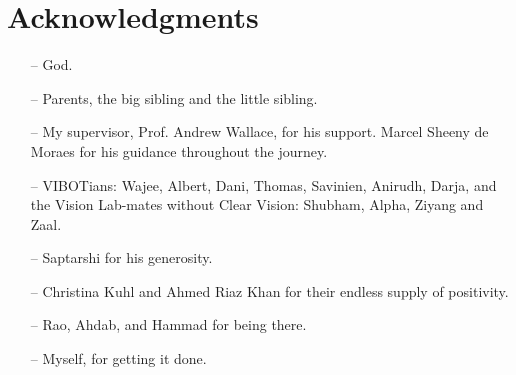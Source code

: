 \doublespacing

\setcounter{page}{1} \pagestyle{plain}


\tableofcontents

\listoffigures
\listoftables

\chapter*{Acknowledgments}
         {\protect{}}
\begin{itemize}
\item[--] God. 
\item[--] Parents, the big sibling and the little sibling.
\item[--] My supervisor, Prof. Andrew Wallace, for his support. Marcel Sheeny de Moraes for his guidance throughout the journey.
\item[--] VIBOTians: Wajee, Albert, Dani, Thomas, Savinien, Anirudh, Darja, and the Vision Lab-mates without Clear Vision: Shubham, Alpha, Ziyang and Zaal. 
\item[--] Saptarshi for his generosity.
\item[--] Christina Kuhl and Ahmed Riaz Khan for their endless supply of positivity. 
\item [--]Rao, Ahdab, and Hammad for being there. 
\item[--] Myself, for getting it done.
\end{itemize}

\pagestyle{fancy}